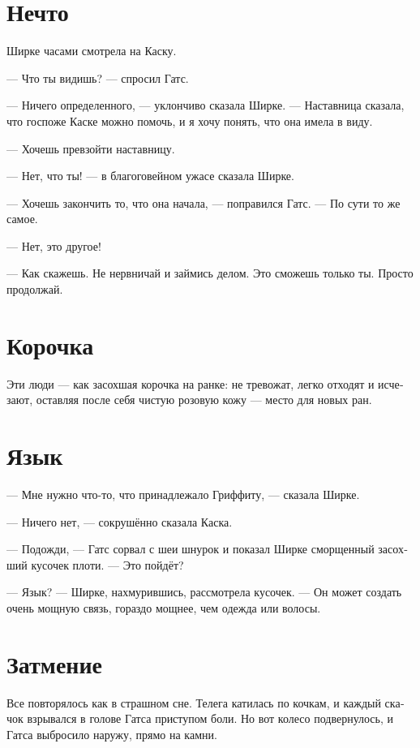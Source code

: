\documentclass[a4paper,12pt,fleqn]{book}\usepackage{polyglossia}\setdefaultlanguage[babelshorthands=true]{russian}\setotherlanguage{english}\defaultfontfeatures{Ligatures=TeX,Mapping=tex-text}\usepackage{xcolor}\newcommand{\ml}[3]{#2}
\begin{document}
\section{Нечто}

Ширке часами смотрела на Каску.

--- Что ты видишь? --- спросил Гатс.

--- Ничего определенного, --- уклончиво сказала Ширке.
--- Наставница сказала, что госпоже Каске можно помочь, и я хочу понять, что она имела в виду.

--- Хочешь превзойти наставницу.

--- Нет, что ты! --- в благоговейном ужасе сказала Ширке.

--- Хочешь закончить то, что она начала, --- поправился Гатс.
--- По сути то же самое.

--- Нет, это другое!

--- Как скажешь.
Не нервничай и займись делом.
Это сможешь только ты.
Просто продолжай.

\section{Корочка}

Эти люди --- как засохшая корочка на ранке: не тревожат, легко отходят и исчезают, оставляя после себя чистую розовую кожу --- место для новых ран.

\section{Язык}

--- Мне нужно что-то, что принадлежало Гриффиту, --- сказала Ширке.

--- Ничего нет, --- сокрушённо сказала Каска.

--- Подожди, --- Гатс сорвал с шеи шнурок и показал Ширке сморщенный засохший кусочек плоти.
--- Это пойдёт?

--- Язык? --- Ширке, нахмурившись, рассмотрела кусочек.
--- Он может создать очень мощную связь, гораздо мощнее, чем одежда или волосы.

\section{Затмение}

Все повторялось как в страшном сне.
Телега катилась по кочкам, и каждый скачок взрывался в голове Гатса приступом боли.
Но вот колесо подвернулось, и Гатса выбросило наружу, прямо на камни.
\end{document}
